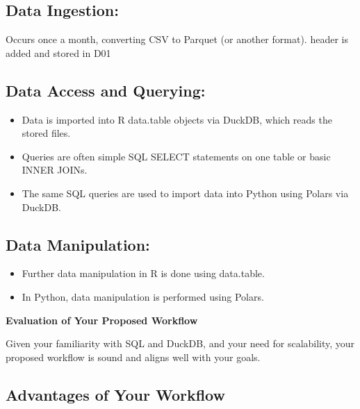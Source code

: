 \documentclass[
  american,
  10,
  a4paper,
]{book}
\providecommand{\tightlist}{%
  \setlength{\itemsep}{0pt}\setlength{\parskip}{0pt}}
\theoremstyle{definition}
\theoremstyle{remark}
\begin{document}
\subsection{Data Ingestion:}\label{data-ingestion}

Occurs once a month, converting CSV to Parquet (or another format).
header is added and stored in D01

\subsection{Data Access and Querying:}\label{data-access-and-querying}

\begin{itemize}
\tightlist
\item
  Data is imported into R data.table objects via DuckDB, which reads the
  stored files.
\item
  Queries are often simple SQL SELECT statements on one table or basic
  INNER JOINs.
\item
  The same SQL queries are used to import data into Python using Polars
  via DuckDB.
\end{itemize}

\subsection{Data Manipulation:}\label{data-manipulation}

\begin{itemize}
\tightlist
\item
  Further data manipulation in R is done using data.table.
\item
  In Python, data manipulation is performed using Polars.
\end{itemize}

\textbf{Evaluation of Your Proposed Workflow}

Given your familiarity with SQL and DuckDB, and your need for
scalability, your proposed workflow is sound and aligns well with your
goals.

\subsection{\texorpdfstring{\textbf{Advantages of Your
Workflow}}{Advantages of Your Workflow}}\label{advantages-of-your-workflow}
\end{document}
